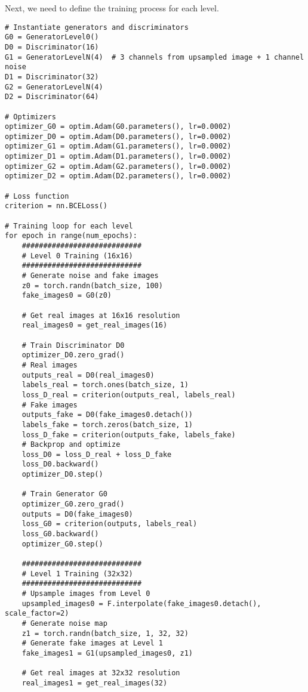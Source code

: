 Next, we need to define the training process for each level.

\begin{lstlisting}[style=python]
# Instantiate generators and discriminators
G0 = GeneratorLevel0()
D0 = Discriminator(16)
G1 = GeneratorLevelN(4)  # 3 channels from upsampled image + 1 channel noise
D1 = Discriminator(32)
G2 = GeneratorLevelN(4)
D2 = Discriminator(64)

# Optimizers
optimizer_G0 = optim.Adam(G0.parameters(), lr=0.0002)
optimizer_D0 = optim.Adam(D0.parameters(), lr=0.0002)
optimizer_G1 = optim.Adam(G1.parameters(), lr=0.0002)
optimizer_D1 = optim.Adam(D1.parameters(), lr=0.0002)
optimizer_G2 = optim.Adam(G2.parameters(), lr=0.0002)
optimizer_D2 = optim.Adam(D2.parameters(), lr=0.0002)

# Loss function
criterion = nn.BCELoss()

# Training loop for each level
for epoch in range(num_epochs):
    ############################
    # Level 0 Training (16x16)
    ############################
    # Generate noise and fake images
    z0 = torch.randn(batch_size, 100)
    fake_images0 = G0(z0)
    
    # Get real images at 16x16 resolution
    real_images0 = get_real_images(16)
    
    # Train Discriminator D0
    optimizer_D0.zero_grad()
    # Real images
    outputs_real = D0(real_images0)
    labels_real = torch.ones(batch_size, 1)
    loss_D_real = criterion(outputs_real, labels_real)
    # Fake images
    outputs_fake = D0(fake_images0.detach())
    labels_fake = torch.zeros(batch_size, 1)
    loss_D_fake = criterion(outputs_fake, labels_fake)
    # Backprop and optimize
    loss_D0 = loss_D_real + loss_D_fake
    loss_D0.backward()
    optimizer_D0.step()
    
    # Train Generator G0
    optimizer_G0.zero_grad()
    outputs = D0(fake_images0)
    loss_G0 = criterion(outputs, labels_real)
    loss_G0.backward()
    optimizer_G0.step()
    
    ############################
    # Level 1 Training (32x32)
    ############################
    # Upsample images from Level 0
    upsampled_images0 = F.interpolate(fake_images0.detach(), scale_factor=2)
    # Generate noise map
    z1 = torch.randn(batch_size, 1, 32, 32)
    # Generate fake images at Level 1
    fake_images1 = G1(upsampled_images0, z1)
    
    # Get real images at 32x32 resolution
    real_images1 = get_real_images(32)
    

\end{lstlisting}
